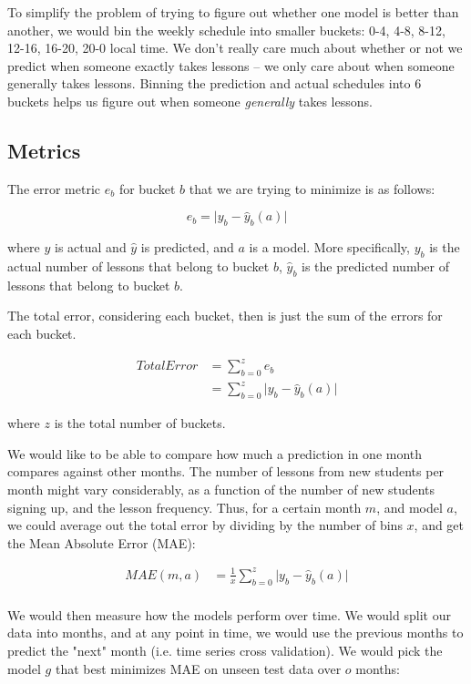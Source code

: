 \documentclass[oneside]{article}
\begin{document}
To simplify the problem of trying to figure out whether one model is better
than another, we would bin the weekly schedule into smaller buckets: 0-4, 4-8,
8-12, 12-16, 16-20, 20-0 local time. We don't really care much about whether or
not we predict when someone exactly takes lessons -- we only care about when
someone generally takes lessons. Binning the prediction and actual schedules
into $6$ buckets helps us figure out when someone \emph{generally} takes lessons.

\subsection{Metrics}

The error metric $e_b$ for bucket $b$ that we are trying to minimize is as follows:

\begin{equation}
  e_b = \lvert y_{b} - \hat{y}_{b}(a) \rvert
\end{equation}

where $y$ is actual and $\hat{y}$ is predicted, and $a$ is a model.  More
specifically, $y_{b}$ is the actual number of lessons that belong to bucket
$b$, $\hat{y}_{b}$ is the predicted number of lessons that belong to bucket
$b$.

The total error, considering each bucket, then is just the sum of the errors
for each bucket.

\begin{align}
  Total Error &= \sum_{b=0}^{z}{e_b} \\
  &= \sum_{b=0}^{z}{\lvert y_{b} - \hat{y}_{b}(a) \rvert}
\end{align}

where $z$ is the total number of buckets.

We would like to be able to compare how much a prediction in one month compares
against other months. The number of lessons from new students per month might
vary considerably, as a function of the number of new students signing up, and
the lesson frequency. Thus, for a certain month $m$, and model $a$, we could
average out the total error by dividing by the number of bins $x$, and get
the Mean Absolute Error (MAE):

\begin{align}
  MAE(m,a) &= \frac{1}{x}\sum_{b=0}^{z}{\lvert y_{b} - \hat{y}_{b}(a) \rvert}\\
\end{align}

We would then measure how the models perform over time. We would split our data
into months, and at any point in time, we would use the previous months to
predict the "next" month (i.e. time series cross validation)\cite{tscv}. We would pick the
model $g$ that best minimizes MAE on unseen test data over $o$ months:
\end{document}
